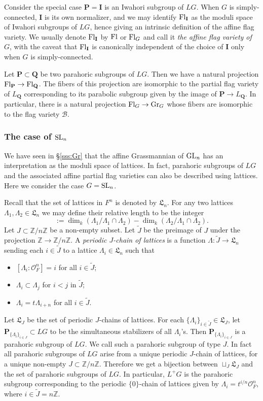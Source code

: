\documentclass[]{pcmi}
\let\oldsubsubsection\subsubsection
\renewcommand{\subsubsection}[1]{%
\setcounter{subsubsection}{\value{equation}}%
\oldsubsubsection{#1}%
\refstepcounter{equation}%
}
\theoremstyle{plain}
\theoremstyle{definition}
\def\ZZ{\mathbb{Z}}
\def\calO{\mathcal{O}}
\newcommand{\sB}{\ensuremath{\mathscr{B}}\xspace}
\newcommand{\sB}{\ensuremath{\mathcal{B}}\xspace}
\def\bI{\mathbf{I}}
\def\bP{\mathbf{P}}
\def\bQ{\mathbf{Q}}
\newcommand\frL{\mathfrak{L}}
\newcommand\tilJ{\widetilde{J}}
\newcommand{\Fl}{\textup{Fl}}
\newcommand{\Gr}{\textup{Gr}}
\newcommand\GL{\textup{GL}}
\newcommand\SL{\textup{SL}}
\renewcommand{\L}{\Lambda}
\begin{document}
Consider the special case $\bP=\bI$ is an Iwahori subgroup of $LG$. When $G$ is simply-connected, $\bI$ is its own normalizer, and we may identify $\Fl_{\bI}$ as the moduli space of Iwahori subgroups of $LG$, hence giving an intrinsic definition of the affine flag variety. We usually denote $\Fl_{\bI}$ by $\Fl$ or $\Fl_{G}$ and call it {\em the affine flag variety of $G$}, with the caveat that $\Fl_{\bI}$ is canonically independent of the choice of $\bI$ only when $G$ is simply-connected.

Let $\bP\subset\bQ$ be two parahoric subgroups of $LG$. Then we have a natural projection $\Fl_{\bP}\to \Fl_{\bQ}$. The fibers of this projection are isomorphic to the partial flag variety of $L_{\bQ}$ corresponding to its parabolic subgroup given by the image of $\bP\to L_{\bQ}$. In particular, there is a natural projection $\Fl_{G}\to \Gr_{G}$ whose fibers are isomorphic to the flag variety $\sB$.


\subsubsection{The case of $\SL_{n}$}\label{sss:GLn parahoric} We have seen in \S\ref{sss:Gr} that the affine Grassmannian of $\GL_{n}$ has an interpretation as the moduli space of lattices. In fact, parahoric subgroups of $LG$ and the associated affine partial flag varieties can also be described using lattices. Here we consider the case $G=\SL_{n}$.  

Recall that the set of lattices in $F^{n}$ is denoted by $\frL_{n}$. For any two lattices $\L_{1},\L_{2}\in\frL_{n}$ we may define their relative length to be the integer
\begin{equation*}
[\L_{1}:\L_{2}]:=\dim_{k}(\L_{1}/\L_{1}\cap\L_{2})-\dim_{k}(\L_{2}/\L_{1}\cap\L_{2}).
\end{equation*}
Let $J\subset \ZZ/n\ZZ$ be a non-empty subset. Let $\tilJ$ be the preimage of $J$ under the projection  $\ZZ\to\ZZ/n\ZZ$. A {\em periodic $J$-chain of lattices} is a function $\L:\tilJ\to \frL_{n}$ sending each $i\in \tilJ$ to a lattice $\L_{i}\in\frL_{n}$ such that
\begin{itemize}
\item $[\L_{i}:\calO_{F}^{n}]=i$  for all $i\in \tilJ$;
\item $\L_{i}\subset \L_{j}$ for $i<j$ in $\tilJ$;
\item $\L_{i}=t\L_{i+n}$ for all $i\in \tilJ$.
\end{itemize}
Let $\frL_{J}$ be the set of periodic $J$-chains of lattices. For each $\{\L_{i}\}_{i\in \tilJ}\in\frL_{J}$, let $\bP_{\{\L_{i}\}_{i\in J}}\subset LG$ to be the simultaneous stabilizers of all $\L_{i}$'s. Then $\bP_{\{\L_{i}\}_{i\in J}}$ is a parahoric subgroup of $LG$. We call such a parahoric subgroup of type $J$. In fact all parahoric subgroups of $LG$ arise from a unique periodic $J$-chain of lattices, for a unique non-empty $J\subset \ZZ/n\ZZ$.  Therefore we get a bijection between $\sqcup_{J}\frL_{J}$ and the set of parahoric subgroups of $LG$.  In particular, $L^{+}G$ is the parahoric subgroup corresponding to the periodic $\{0\}$-chain of lattices given by $\L_{i}=t^{i/n}\calO^{n}_{F}$, where $i\in \tilJ=n\ZZ$. 
\end{document}
